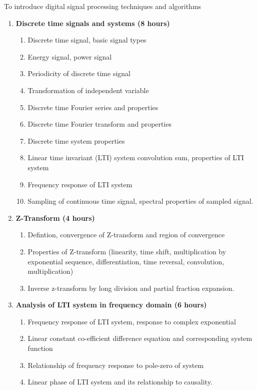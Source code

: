 
\cobjectives
  To introduce digital signal processing techniques and algorithms
  \VS

\begin{enumerate}
  \item \textbf{Discrete time signals and systems \hfill (8 hours)}
    \begin{enumerate}
      \item Discrete time signal, basic signal types
      \item Energy signal, power signal
      \item Periodicity of discrete time signal
      \item Transformation of independent variable
      \item Discrete time Fourier series and properties
      \item Discrete time Fourier transform and properties
      \item Discrete time system properties
      \item Linear time invariant (LTI) system convolution sum, properties of LTI system
      \item Frequency response of LTI system
      \item Sampling of continuous time signal, spectral properties of sampled signal.
    \end{enumerate}
    \vs

  \item \textbf{Z-Transform \hfill (4 hours)}
    \begin{enumerate}
      \item Defintion, convergence of Z-transform and region of convergence
      \item Properties of Z-transform (linearity, time shift, multiplication by exponential sequence, differentiation, time reversal, convolution, multiplication)
      \item Inverse z-transform by long division and partial fraction expansion.
    \end{enumerate}
    \vs

  \item \textbf{Analysis of LTI system in frequency domain \hfill (6 hours)}
    \begin{enumerate}
      \item Frequency response of LTI system, response to complex exponential
      \item Linear constant co-efficient difference equation and corresponding system function
      \item Relationship of frequency response to pole-zero of system
      \item Linear phase of LTI system and its relationship to causality.
    \end{enumerate}
    \vs


\end{enumerate}

